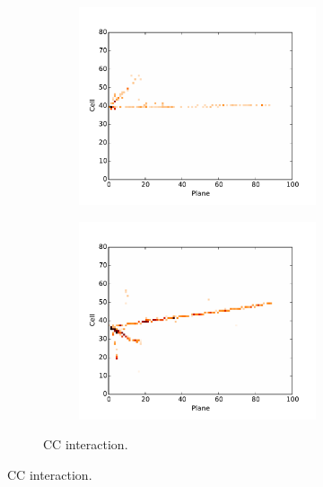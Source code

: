 \begin{figure}[t]
\begin{subfigure}[c]{\textwidth}
\centering
\begin{subfigure}[c]{0.47\textwidth}
\includegraphics[width=\textwidth]{figures/cnn/view_truetype2_caltype2_event274_x.pdf}
\vspace{-20pt}
\caption*{\xview}
\end{subfigure}
\begin{subfigure}[c]{0.47\textwidth}
\includegraphics[width=\textwidth]{figures/cnn/view_truetype2_caltype2_event274_y.pdf}
\vspace{-20pt}
\caption*{\yview}
\end{subfigure}
\vspace{-10pt}
\caption{\numu CC interaction.}
\label{pixnumu}
\end{subfigure}


\end{figure}

